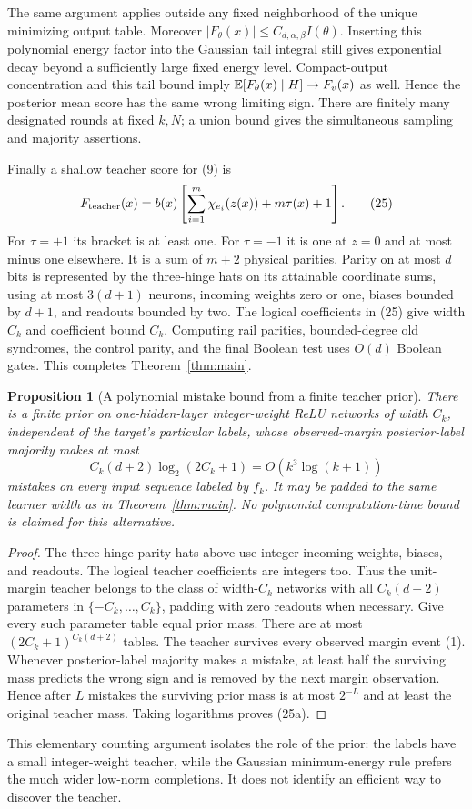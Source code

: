 \documentclass[11pt]{article}
\newtheorem{proposition}[theorem]{Proposition}
\begin{document}
The same argument applies outside any fixed neighborhood of the unique
minimizing output table. Moreover $|F_\theta(x)|\le C_{d,\alpha,\beta}I(\theta)$.
Inserting this polynomial energy factor into the Gaussian tail integral
still gives exponential decay beyond a sufficiently large fixed energy
level. Compact-output concentration and this tail bound imply
$\mathbb E[F_\theta(x)\mid H]\to F_v(x)$ as well. Hence the posterior mean
score has the same wrong limiting sign. There are finitely many
designated rounds at fixed $k,N$; a union bound gives the simultaneous
sampling and majority assertions.

Finally a shallow teacher score for (9) is
\[
 F_{\rm teacher}(x)
       =b(x)\left[\sum_{i=1}^m\chi_{e_i}(z(x))+m\tau(x)+1\right]. \tag{25}
\]
For $\tau=+1$ its bracket is at least one. For $\tau=-1$ it is one
at $z=0$ and at most minus one elsewhere.
It is a sum of $m+2$ physical parities. Parity on at most $d$ bits is
represented by the three-hinge hats on its attainable coordinate sums,
using at most $3(d+1)$ neurons, incoming weights zero or one, biases
bounded by $d+1$, and readouts bounded by two.
The logical coefficients in (25) give width $C_k$ and coefficient
bound $C_k$. Computing rail parities, bounded-degree old syndromes,
the control parity, and the final Boolean test uses $O(d)$ Boolean
gates. This completes Theorem~\ref{thm:main}.

\begin{proposition}[A polynomial mistake bound from a finite teacher prior]
There is a finite prior on one-hidden-layer integer-weight ReLU networks
of width $C_k$, independent of the target's particular labels, whose
observed-margin posterior-label majority makes at most
\[
                 C_k(d+2)\log_2(2C_k+1)=O(k^3\log(k+1))
                                                               \tag{25a}
\]
mistakes on every input sequence labeled by $f_k$.
It may be padded to the same learner width as in Theorem~\ref{thm:main}.
No polynomial computation-time bound is claimed for this alternative.
\end{proposition}
\begin{proof}
The three-hinge parity hats above use integer incoming weights, biases,
and readouts. The logical teacher coefficients are integers too.
Thus the unit-margin teacher belongs to the class of width-$C_k$
networks with all $C_k(d+2)$ parameters in
$\{-C_k,\ldots,C_k\}$, padding with zero readouts when necessary.
Give every such parameter table equal prior mass.
There are at most $(2C_k+1)^{C_k(d+2)}$ tables.
The teacher survives every observed margin event (1).
Whenever posterior-label majority makes a mistake, at least half
the surviving mass predicts the wrong sign and is removed by the next
margin observation. Hence after $L$ mistakes the surviving prior mass
is at most $2^{-L}$ and at least the original teacher mass.
Taking logarithms proves (25a).
\end{proof}
This elementary counting argument isolates the role of the prior:
the labels have a small integer-weight teacher, while the Gaussian
minimum-energy rule prefers the much wider low-norm completions.
It does not identify an efficient way to discover the teacher.
\end{document}
